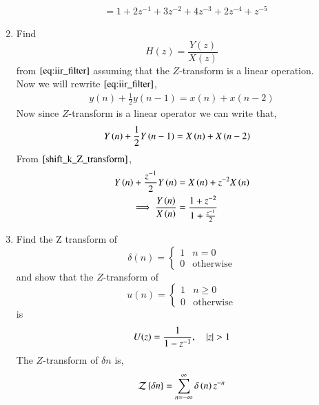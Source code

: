 \documentclass[journal,12pt,twocolumn]{IEEEtran}
\renewcommand\thesection{\arabic{section}}
\begin{document}
\begin{enumerate}[label=\thesection.\arabic*]
\begin{align}
                                   &= 1 + 2z^{-1} + 3z^{-2} + 4z^{-3} + 2z^{-4} + z^{-5} 
    \end{align}
   \item Find
   \begin{equation}
   H(z) = \frac{Y(z)}{X(z)}
   \end{equation}
   from  $\eqref{eq:iir_filter}$ assuming that the $Z$-transform is a linear operation.
   \\
    \solution 
     Now we will rewrite $\eqref{eq:iir_filter}$,
      \begin{align}
          y(n) + \frac{1}{2}y(n-1) = x(n) + x(n-2)
      \end{align}
     Now since $Z$-transform is a linear operator we can write that,
      \begin{align}
          Y\left(n\right) + \frac{1}{2}Y\left(n-1\right) &= X\left(n\right) + X\left(n-2\right)
      \end{align}
      From $\eqref{shift_k_Z_transform}$,
      \begin{align}
          Y\left(n\right) + \frac{z^{-1}}{2}Y\left(n\right) &= X\left(n\right) + z^{-2}X\left(n\right)\\
       \implies \frac{Y\left(n\right)}{X\left(n\right)} &= \frac{1 + z^{-2}}{1 + \frac{z^{-1}}{2}} 
      \end{align}       
      \item Find the Z transform of 
      \begin{equation}
      \label{delta}
      \delta(n)
      =
      \begin{cases}
      1 & n = 0
      \\
      0 & \text{otherwise}
      \end{cases}
      \end{equation}
      and show that the $Z$-transform of
      \begin{equation}
      \label{eq:unit_step}
      u(n)
      =
      \begin{cases}
      1 & n \ge 0
      \\
      0 & \text{otherwise}
      \end{cases}
      \end{equation}
      is
      \begin{equation}
      U(z) = \frac{1}{1-z^{-1}}, \quad \left\vert z\right\vert > 1
      \end{equation}
      \solution 
      The $Z$-transform of $\delta{n}$ is,
      \begin{align}
          \mathcal{Z}\cbrak{\delta{n}} &= \sum_{n=-\infty}^{\infty}\delta\brak{n}z^{-n}\\

\end{align}
\end{enumerate}
\end{document}

